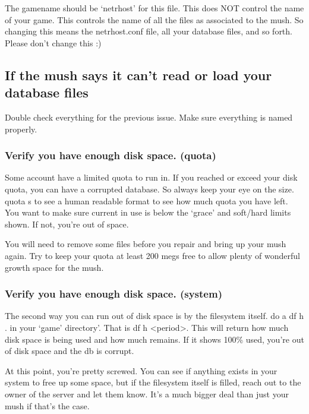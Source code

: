 \documentclass[letterpaper,10pt,english]{sphinxmanual}
\begin{document}
\sphinxAtStartPar
The gamename should be ‘netrhost’ for this file.  This does NOT control
the name of your game.  This controls the name of all the files
as associated to the mush.  So changing this means the netrhost.conf
file, all your database files, and so forth.  Please don’t change this :)


\subsection{If the mush says it can’t read or load your database files}
\label{\detokenize{troubleshooting:if-the-mush-says-it-can-t-read-or-load-your-database-files}}
\sphinxAtStartPar
Double check everything for the previous issue. Make sure everything is named properly.


\subsubsection{Verify you have enough disk space. (quota)}
\label{\detokenize{troubleshooting:verify-you-have-enough-disk-space-quota}}
\sphinxAtStartPar
Some account have a limited quota to run in.  If you reached or exceed
your disk quota, you can have a corrupted database.  So always keep
your eye on the size.  quota \sphinxhyphen{}s to see a human readable format to see
how much quota you have left.  You want to make sure current in use is
below the ‘grace’ and soft/hard limits shown.  If not, you’re out of
space.

\sphinxAtStartPar
You will need to remove some files before you repair and bring up your
mush again.  Try to keep your quota at least 200 megs free to allow
plenty of wonderful growth space for the mush.


\subsubsection{Verify you have enough disk space.  (system)}
\label{\detokenize{troubleshooting:verify-you-have-enough-disk-space-system}}
\sphinxAtStartPar
The second way you can run out of disk space is by the filesystem itself.
do a df \sphinxhyphen{}h . in your ‘game’ directory’.  That is df \sphinxhyphen{}h \textless{}period\textgreater{}.
This will return how much disk space is being used and how much remains.
If it shows 100\% used, you’re out of disk space and the db is corrupt.

\sphinxAtStartPar
At this point, you’re pretty screwed.  You can see if anything exists
in your system to free up some space, but if the filesystem itself
is filled, reach out to the owner of the server and let them know.
It’s a much bigger deal than just your mush if that’s the case.
\end{document}
